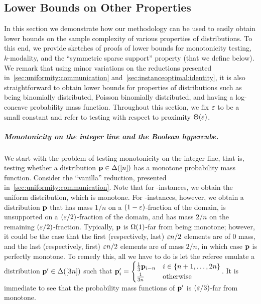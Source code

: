 \subsection{Lower Bounds on Other Properties}\label{sec:other}
In this section we demonstrate how our methodology can be used to easily obtain lower bounds on the sample complexity of various properties of distributions. To this end, we provide sketches of proofs of lower bounds for monotonicity testing, $k$-modality, and the ``symmetric sparse support'' property (that we define below). We remark that using minor variations on the reductions presented in~\cref{sec:uniformity:communication} and~\cref{sec:instanceoptimal:identity}, it is also straightforward to obtain lower bounds for properties of distributions such as being binomially distributed, Poisson binomially distributed, and having a log-concave probability mass function. Throughout this section, we fix $\varepsilon$ to be a small constant and refer to testing with respect to proximity $\bigTheta{\eps}$.

\subparagraph{Monotonicity on the integer line and the Boolean hypercube.} We start with the problem of testing monotonicity on the integer line, that is, testing whether a distribution $\mathbf{p}\in\Delta\!\left([n]\right)$ has a monotone probability mass function. Consider the ``vanilla'' reduction, presented in~\cref{sec:uniformity:communication}. Note that for \yes-instances, we obtain the uniform distribution, which is monotone. For \no-instances, however, we obtain a distribution $\mathbf{p}$ that has mass $1/n$ on a $(1-\varepsilon)$-fraction of the domain, is unsupported on a $(\varepsilon/2)$-fraction of the domain, and has mass $2/n$ on the remaining $(\varepsilon/2)$-fraction. Typically, $\mathbf{p}$ is $\bigOmega{1}$-far from being monotone; however, it could be the case that the first (respectively, last) $\varepsilon n / 2$ elements are of $0$ mass, and the last (respectively, first) $\varepsilon n / 2$ elements are of mass $2/n$, in which case $\mathbf{p}$ is perfectly monotone. To remedy this, all we have to do is let the referee emulate a distribution $\mathbf{p}'\in\Delta\!\left([3n]\right)$ such that 
$\mathbf{p}'_i = \begin{cases}
	\frac{1}{3}\mathbf{p}_{i-n} & i\in\{n+1, \ldots, 2n\} \\
	\frac{1}{3n} & \text{otherwise}
 \end{cases}$. It is immediate to see that the probability mass functions of $\mathbf{p}'$ is $(\varepsilon/3)$-far from monotone.
 
